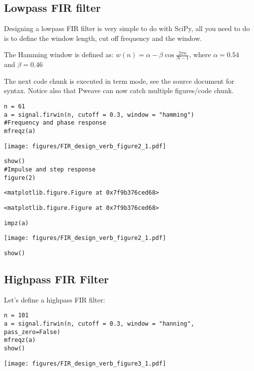 \documentclass[a4paper,11pt,final]{article}
\begin{document}
\subsection{Lowpass FIR filter}

Designing a lowpass FIR filter is very simple to do with SciPy, all you
need to do is to define the window length, cut off frequency and the
window.

The Hamming window is defined as:
$w(n) = \alpha - \beta\cos\frac{2\pi n}{N-1}$, where $\alpha=0.54$ and
$\beta=0.46$

The next code chunk is executed in term mode, see the source document
for syntax. Notice also that Pweave can now catch multiple
figures/code chunk.


\begin{verbatim}
n = 61
a = signal.firwin(n, cutoff = 0.3, window = "hamming")
#Frequency and phase response
mfreqz(a)
\end{verbatim}
\texttt{[image: figures/FIR\_design\_verb\_figure2\_1.pdf]}

\begin{verbatim}
show()
#Impulse and step response
figure(2)
\end{verbatim}
\begin{verbatim}
<matplotlib.figure.Figure at 0x7f9b376ced68>
\end{verbatim}
\begin{verbatim}
<matplotlib.figure.Figure at 0x7f9b376ced68>
\end{verbatim}

\begin{verbatim}
impz(a)
\end{verbatim}
\texttt{[image: figures/FIR\_design\_verb\_figure2\_1.pdf]}

\begin{verbatim}
show()
\end{verbatim}


\subsection{Highpass FIR Filter}

Let's define a highpass FIR filter:


\begin{verbatim}
n = 101
a = signal.firwin(n, cutoff = 0.3, window = "hanning", pass_zero=False)
mfreqz(a)
show()
\end{verbatim}
\texttt{[image: figures/FIR\_design\_verb\_figure3\_1.pdf]}
\end{document}
